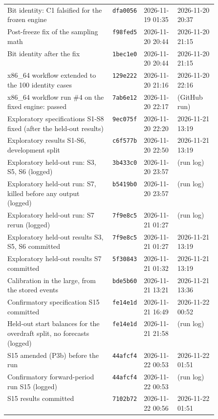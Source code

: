 \begin{tabular}{p{0.50\linewidth} l l l}
Bit identity: C1 falsified for the frozen engine & \texttt{dfa0056} & 2026-11-19 01:35 & 2026-11-20 20:37 \\
Post-freeze fix of the sampling math & \texttt{f98fed5} & 2026-11-20 20:44 & 2026-11-20 21:15 \\
Bit identity after the fix & \texttt{1bec1e0} & 2026-11-20 20:44 & 2026-11-20 21:15 \\
x86\_64 workflow extended to the 100 identity cases & \texttt{129e222} & 2026-11-20 21:16 & 2026-11-20 22:16 \\
x86\_64 workflow run \#4 on the fixed engine: passed & \texttt{7ab6e12} & 2026-11-20 22:17 & (GitHub run) \\
Exploratory specifications S1-S8 fixed (after the held-out results) & \texttt{9ec075f} & 2026-11-20 22:20 & 2026-11-21 13:19 \\
Exploratory results S1-S6, development split & \texttt{c6f577b} & 2026-11-20 22:50 & 2026-11-21 13:19 \\
Exploratory held-out run: S3, S5, S6 (logged) & \texttt{3b433c0} & 2026-11-20 23:57 & (run log) \\
Exploratory held-out run: S7, killed before any output (logged) & \texttt{b5419b0} & 2026-11-20 23:57 & (run log) \\
Exploratory held-out run: S7 rerun (logged) & \texttt{7f9e8c5} & 2026-11-21 01:27 & (run log) \\
Exploratory held-out results S3, S5, S6 committed & \texttt{7f9e8c5} & 2026-11-21 01:27 & 2026-11-21 13:19 \\
Exploratory held-out results S7 committed & \texttt{5f30843} & 2026-11-21 01:32 & 2026-11-21 13:19 \\
Calibration in the large, from the stored events & \texttt{bde5b60} & 2026-11-21 13:21 & 2026-11-21 13:36 \\
Confirmatory specification S15 committed & \texttt{fe14e1d} & 2026-11-21 16:49 & 2026-11-22 00:52 \\
Held-out start balances for the overdraft split, no forecasts (logged) & \texttt{fe14e1d} & 2026-11-21 21:58 & (run log) \\
S15 amended (P3b) before the run & \texttt{44afcf4} & 2026-11-22 00:53 & 2026-11-22 01:51 \\
Confirmatory forward-period run S15 (logged) & \texttt{44afcf4} & 2026-11-22 00:53 & (run log) \\
S15 results committed & \texttt{7102b72} & 2026-11-22 00:56 & 2026-11-22 01:51 \\
\bottomrule
\end{tabular}
